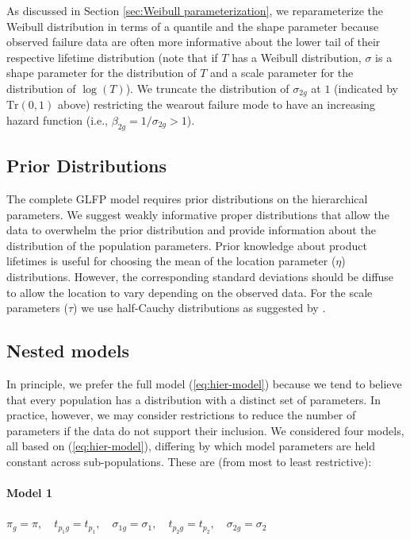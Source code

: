 \documentclass[11pt]{article}
\begin{document}
As discussed in Section \ref{sec:Weibull parameterization}, we reparameterize the Weibull distribution in terms of a quantile and the shape parameter because observed failure data are often more informative about the lower tail of their respective lifetime distribution (note that if $T$ has a Weibull distribution, $\sigma$ is a shape parameter for the distribution of $T$ and a scale parameter for the distribution of $\log(T)$). We truncate the distribution of $\sigma_{2g}$ at $1$ (indicated by $\text{Tr}(0,1)$ above) restricting the wearout failure mode to have an increasing hazard function (i.e., $\beta_{2g} = 1/\sigma_{2g}>1$). %

\subsection{Prior Distributions}
The complete GLFP model requires prior distributions on the hierarchical parameters.  We suggest weakly informative proper distributions that allow the data to overwhelm the prior distribution and provide information about the distribution of the population parameters.  Prior knowledge about product lifetimes is useful for choosing the mean of the location parameter ($\eta$) distributions.  However, the corresponding standard deviations should be diffuse to allow the location to vary depending on the observed data.  For the scale parameters ($\tau$) we use half-Cauchy distributions as suggested by \citet{gelman2014bayesian}.  

\subsection{Nested models}
In principle, we prefer the full model (\ref{eq:hier-model}) because we tend to believe that every population has a distribution with a distinct set of parameters. In practice, however, we may consider restrictions to reduce the number of parameters if the data do not support their inclusion.  We considered four models, all based on (\ref{eq:hier-model}), differing by which model parameters are held constant across sub-populations. These are (from most to least restrictive):

\paragraph{Model 1} $\pi_{g} = \pi,\quad t_{p_{1}g} = t_{p_1},\quad \sigma_{1g}=\sigma_1,\quad t_{p_{2}g} = t_{p_2},\quad \sigma_{2g} = \sigma_2$
\end{document}
